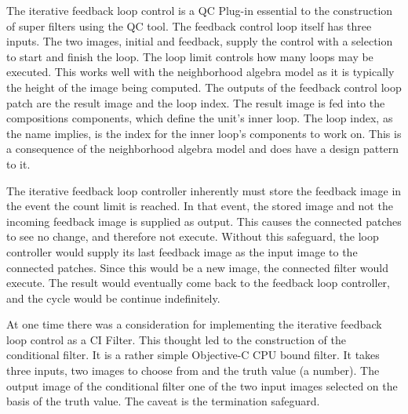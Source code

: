 \documentclass[11pt]{article}
\begin{document}
The iterative feedback loop control is a QC Plug-in essential to the construction of super filters using the QC tool.  The feedback control loop itself has three inputs.  The two images, initial and feedback, supply the control with a selection to start and finish the loop.  The loop limit controls how many loops may be executed.  This works well with the neighborhood algebra model as it is typically the height of the image being computed.  The outputs of the feedback control loop patch are the result image and the loop index.  The result image is fed into the compositions components, which define the unit's inner loop.  The loop index, as the name implies, is the index for the inner loop's components to work on.   This is a consequence of the neighborhood algebra model and does have a design pattern to it. 

The iterative feedback loop controller inherently must store the feedback image in the event the count limit is reached.  In that event, the stored image and not the incoming feedback image is supplied as output.  This causes the connected patches to see no change, and therefore not execute.  Without this safeguard, the loop controller would supply its last feedback image as the input image to the connected patches.  Since this would be a new image, the connected filter would execute.  The result would eventually come back to the feedback loop controller, and the cycle would be continue indefinitely.


At one time there was a consideration for implementing the iterative feedback loop control as a CI Filter.   This thought led to the construction of the conditional filter.  It is a rather simple Objective-C CPU bound filter.  It takes three inputs, two images to choose from and the truth value (a number).   The output image of the conditional filter one of the two input images selected on the basis of the truth value.  The caveat is the termination safeguard.

\end{document}

